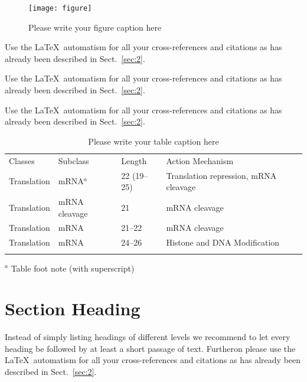 \begin{figure}[t]
\sidecaption[t]
\texttt{[image: figure]}
%
%
\caption{Please write your figure caption here}
\label{fig:2}       %
\end{figure}

 Use the \LaTeX\ automatism for all your cross-references and citations as has already been described in Sect.~\ref{sec:2}.

 Use the \LaTeX\ automatism for all your cross-refer\-ences and citations as has already been described in Sect.~\ref{sec:2}.

 Use the \LaTeX\ automatism for all your cross-refer\-ences and citations as has already been described in Sect.~\ref{sec:2}.
%
%
\begin{table}[!t]
\caption{Please write your table caption here}
\label{tab:1}       %
%
%
\begin{tabular}{p{2cm}p{2.4cm}p{2cm}p{4.9cm}}
\hline\noalign{\smallskip}
Classes & Subclass & Length & Action Mechanism  \\
\noalign{\smallskip}\svhline\noalign{\smallskip}
Translation & mRNA$^a$  & 22 (19--25) & Translation repression, mRNA cleavage\\
Translation & mRNA cleavage & 21 & mRNA cleavage\\
Translation & mRNA  & 21--22 & mRNA cleavage\\
Translation & mRNA  & 24--26 & Histone and DNA Modification\\
\noalign{\smallskip}\hline\noalign{\smallskip}
\end{tabular}
$^a$ Table foot note (with superscript)
\end{table}
%
\section{Section Heading}
\label{sec:3}
Instead of simply listing headings of different levels we recommend to let every heading be followed by at least a short passage of text. Furtheron please use the \LaTeX\ automatism for all your cross-references and citations as has already been described in Sect.~\ref{sec:2}.

